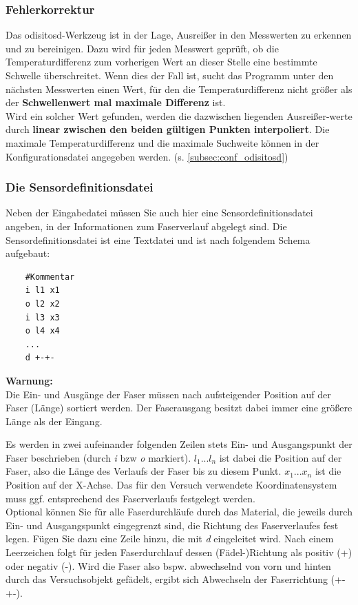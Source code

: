 \documentclass[10pt,a5paper,twoside,titlepage]{scrartcl}
\newenvironment{myshaded}
  {\def\FrameCommand{\colorbox{shadecolor}}
    \MakeFramed {\advance\hsize-\width \FrameRestore}}
 {\endMakeFramed}
\newenvironment{warnung}
  {\colorlet{shadecolor}{yellow!20}%
      \begin{myshaded}
      \begin{minipage}{\linewidth}
	  \hangindent 20pt  
      \textbf{Warnung:}\\
      }
  {\end{minipage}\end{myshaded}}
\begin{document}
	\subsubsection{Fehlerkorrektur}
	Das odisitosd-Werkzeug ist in der Lage, Ausreißer in den Messwerten zu erkennen und zu bereinigen.
	Dazu wird für jeden Messwert geprüft, ob die Temperaturdifferenz zum vorherigen Wert an dieser Stelle eine bestimmte Schwelle überschreitet. Wenn dies der Fall ist, sucht das Programm unter den nächsten Messwerten einen Wert, für den die Temperaturdifferenz nicht größer als der \textbf{Schwellenwert mal maximale Differenz} ist.\\
	Wird ein solcher Wert gefunden, werden die dazwischen liegenden Ausreißer-werte durch \textbf{linear zwischen den beiden gültigen Punkten interpoliert}.
	Die maximale Temperaturdifferenz und die maximale Suchweite können in der Konfigurationsdatei angegeben werden. (s. \ref{subsec:conf_odisitosd})
	\subsubsection{Die Sensordefinitionsdatei}
	\label{subsec:sdef_odisitosd}
	Neben der Eingabedatei müssen Sie auch hier eine Sensordefinitionsdatei angeben, in der Informationen zum Faserverlauf abgelegt sind. Die Sensordefinitionsdatei ist eine Textdatei und ist nach folgendem Schema aufgebaut:\\
	\begin{lstlisting}
	#Kommentar
	i l1 x1
	o l2 x2
	i l3 x3
	o l4 x4
	...
	d +-+-
	\end{lstlisting}
	\begin{warnung}
	Die Ein- und Ausgänge der Faser müssen nach aufsteigender Position auf der Faser (Länge) sortiert werden. Der Faserausgang besitzt dabei immer eine größere Länge als der Eingang.
	\end{warnung}
	Es werden in zwei aufeinander folgenden Zeilen stets Ein- und Ausgangspunkt der Faser beschrieben (durch \emph{i} bzw \emph{o} markiert). $l_1...l_n$ ist dabei die Position auf der Faser, also die Länge des Verlaufs der Faser bis zu diesem Punkt. $x_1...x_n$ ist die Position auf der X-Achse. Das für den Versuch verwendete Koordinatensystem muss ggf. entsprechend des Faserverlaufs festgelegt werden.	\\
	Optional können Sie für alle Faserdurchläufe durch das Material, die jeweils durch Ein- und Ausgangspunkt eingegrenzt sind, die Richtung des Faserverlaufes fest legen. Fügen Sie dazu eine Zeile hinzu, die mit \emph{d} eingeleitet wird. Nach einem Leerzeichen folgt für jeden Faserdurchlauf dessen (Fädel-)Richtung als positiv (+) oder negativ (-). Wird die Faser also bspw. abwechselnd von vorn und  hinten durch das Versuchsobjekt gefädelt, ergibt sich Abwechseln der Faserrichtung (+-+-).
\end{document}
